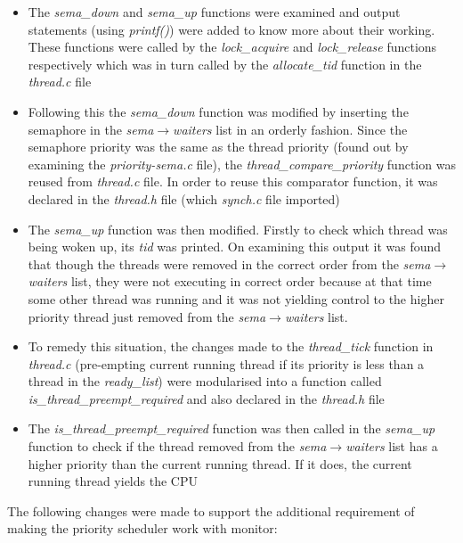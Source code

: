 \documentclass[]{article}
\begin{document}
		\begin{itemize}
			\item The \textit{sema\_down} and \textit{sema\_up} functions were examined and output statements (using \textit{printf()}) were added to know more about their working. These functions were called by the \textit{lock\_acquire} and \textit{lock\_release} functions respectively which was in turn called by the  \textit{allocate\_tid} function in the \textit{thread.c} file
			\item Following this the \textit{sema\_down} function was modified by inserting the semaphore in the \textit{sema$\rightarrow$waiters} list in an orderly fashion. Since the semaphore priority was the same as the thread priority (found out by examining the \textit{priority-sema.c} file), the \textit{thread\_compare\_priority} function was reused from \textit{thread.c} file. In order to reuse this comparator function, it was declared in the \textit{thread.h} file (which \textit{synch.c} file imported)
			\item The \textit{sema\_up} function was then modified. Firstly to check which thread was being woken up, its \textit{tid} was printed. On examining this output it was found that though the threads were removed in the correct order from the \textit{sema$\rightarrow$waiters} list, they were not executing in correct order because at that time some other thread was running and it was not yielding control to the higher priority thread just removed from the \textit{sema$\rightarrow$waiters} list.
			\item To remedy this situation, the changes made to the \textit{thread\_tick} function in \textit{thread.c} (pre-empting current running thread if its priority is less than a thread in the \textit{ready\_list}) were modularised into a function called\\ \textit{is\_thread\_preempt\_required} and also declared in the \textit{thread.h} file
			\item The \textit{is\_thread\_preempt\_required} function was then called in the \textit{sema\_up} function to check if the thread removed from the \textit{sema$\rightarrow$waiters} list has a higher priority than the current running thread. If it does, the current running thread yields the CPU
		\end{itemize}
		The following changes were made to support the additional requirement of making the priority scheduler work with monitor:
\end{document}
